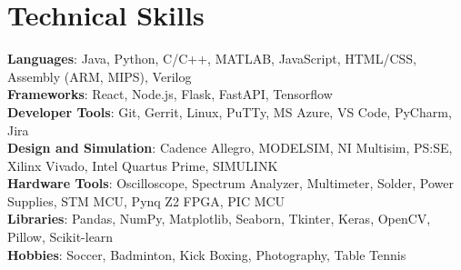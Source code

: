 \documentclass[A4,10pt]{article}
\begin{document}
\section{Technical Skills}
\begin{itemize}[leftmargin=0.15in, label={}]
   \small{\item{
    \textbf{Languages}{: Java, Python, C/C++, MATLAB, JavaScript, HTML/CSS, Assembly (ARM, MIPS), Verilog} \\
    \textbf{Frameworks}{: React, Node.js, Flask, FastAPI, Tensorflow} \\
    \textbf{Developer Tools}{: Git, Gerrit, Linux, PuTTy, MS Azure, VS Code, PyCharm, Jira} \\
    \textbf{Design and Simulation}{: Cadence Allegro, MODELSIM, NI Multisim, PS:SE, Xilinx Vivado, Intel Quartus Prime, SIMULINK}\\
    \textbf{Hardware Tools}{: Oscilloscope, Spectrum Analyzer, Multimeter, Solder, Power Supplies, STM MCU, Pynq Z2 FPGA, PIC MCU}\\
    \textbf{Libraries}{: Pandas, NumPy, Matplotlib, Seaborn, Tkinter, Keras, OpenCV, Pillow, Scikit-learn}\\
    \textbf{Hobbies}{: Soccer, Badminton, Kick Boxing, Photography, Table Tennis}\\
   }}
\end{itemize}
\end{document}
